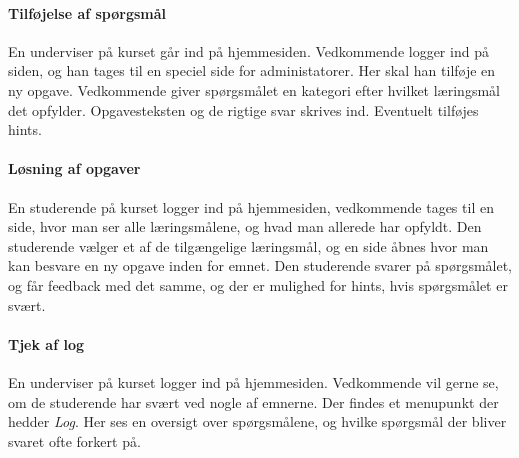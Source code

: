 \documentclass[12pt]{article}
\begin{document}
\paragraph{Tilføjelse af spørgsmål}
En underviser på kurset går ind på hjemmesiden. Vedkommende logger ind på siden, og han tages til en speciel side for administatorer.
Her skal han tilføje en ny opgave. Vedkommende giver spørgsmålet en kategori efter hvilket læringsmål det opfylder. Opgavesteksten og de rigtige svar skrives ind. Eventuelt tilføjes hints.

\paragraph{Løsning af opgaver}
En studerende på kurset logger ind på hjemmesiden, vedkommende tages til en side, hvor man ser alle læringsmålene, og hvad man allerede har opfyldt. Den studerende vælger et af de tilgængelige læringsmål, og en side åbnes hvor man kan besvare en ny opgave inden for emnet. Den studerende svarer på spørgsmålet, og får feedback med det samme, og der er mulighed for hints, hvis spørgsmålet er svært.

\paragraph{Tjek af log}
En underviser på kurset logger ind på hjemmesiden. Vedkommende vil gerne se, om de studerende har svært ved nogle af emnerne. Der findes et menupunkt der hedder \emph{Log}. Her ses en oversigt over spørgsmålene, og hvilke spørgsmål der bliver svaret ofte forkert på.
\end{document}
